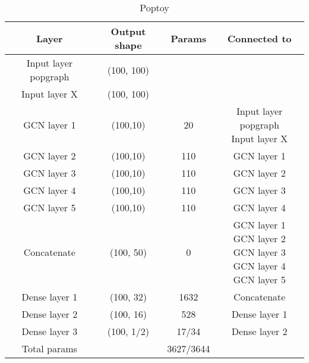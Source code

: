 \begin{table}[H]
    \centering
    \caption{Poptoy}
    \begin{tabular}{c|c c c}
         Layer & Output shape & Params & Connected to\\ \hline\hline
         Input layer popgraph &(100, 100) & & \\ \hline
         Input layer X &  (100, 100)& & \\ \hline
         GCN layer 1 & (100,10) & 20 & \thead{Input layer popgraph \\ Input layer X}   \\ \hline
         GCN layer 2 & (100,10)& 110 & GCN layer 1\\ \hline
         GCN layer 3 & (100,10)& 110  &GCN layer 2\\ \hline
         GCN layer 4 & (100,10)& 110  &GCN layer 3\\ \hline
         GCN layer 5 & (100,10)& 110  &GCN layer 4\\ \hline
         Concatenate & (100, 50)  & 0 & \thead{GCN layer 1\\GCN layer 2\\GCN layer 3\\GCN layer 4\\GCN layer 5} \\ \hline
         Dense layer 1& (100, 32) & 1632 & Concatenate \\
         Dense layer 2& (100, 16) & 528 & Dense layer 1\\
         Dense layer 3& (100, 1/2) & 17/34 & Dense layer 2\\
         \hline\hline
         Total params & & 3627/3644
    \end{tabular}
    \label{tab:Models_Poptoy}
\end{table}

